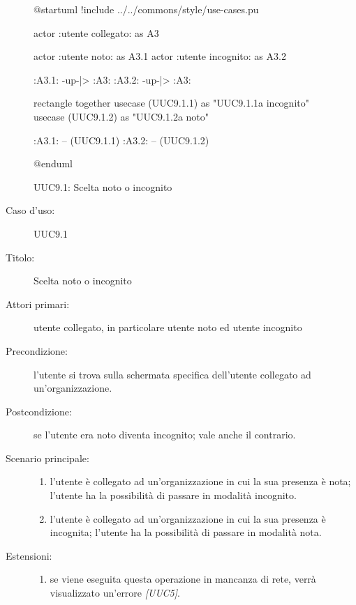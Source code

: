 \documentclass[../../../analisi-dei-requisiti.tex]{subfiles}
\begin{document}
\begin{figure}[h!]
  \centering
  \begin{plantuml}
  @startuml
  !include ../../commons/style/use-cases.pu

  actor :utente collegato: as A3

  actor :utente noto: as A3.1
  actor :utente incognito: as A3.2

  :A3.1: -up-|> :A3:
  :A3.2: -up-|> :A3:

  rectangle {
    together {
      usecase (UUC9.1.1) as "UUC9.1.1\nPassaggio a incognito"
      usecase (UUC9.1.2) as "UUC9.1.2\nPassaggio a noto"
    }
  }

  :A3.1: -- (UUC9.1.1)
  :A3.2: -- (UUC9.1.2)

  @enduml
  \end{plantuml}
  \caption{UUC9.1: Scelta noto o incognito}
  \label{fig:uuc9_1}
\end{figure}

\begin{description}
  \item[Caso d’uso:] UUC9.1
  \item[Titolo:] Scelta noto o incognito
  \item[Attori primari:] utente collegato, in particolare utente noto ed utente incognito
  \item[Precondizione:] l'utente si trova sulla schermata specifica dell'utente collegato ad un'organizzazione.
  \item[Postcondizione:] se l'utente era noto diventa incognito; vale anche il contrario.
  \item[Scenario principale:]
        \begin{enumerate}
          \item l'utente è collegato ad un'organizzazione in cui la sua presenza è nota; l'utente ha la possibilità di passare in modalità incognito.
          \item l'utente è collegato ad un'organizzazione in cui la sua presenza è incognita; l'utente ha la possibilità di passare in modalità nota.
        \end{enumerate}
  \item[Estensioni:]
        \begin{enumerate}
          \item se viene eseguita questa operazione in mancanza di rete, verrà visualizzato un'errore \emph{[UUC5]}.
        \end{enumerate}
\end{description}
\end{document}
